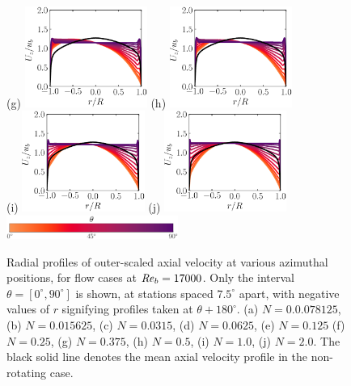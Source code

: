 \documentclass[lineno]{jfm}
\begin{document}
\begin{figure}
                (g) \includegraphics[width=4cm]{Figures/prof_uzub_rotz0_roty0.1875.eps}
                (h) \includegraphics[width=4cm]{Figures/prof_uzub_rotz0_roty0.25.eps} \\
                (i) \includegraphics[width=4cm]{Figures/prof_uzub_rotz0_roty0.5.eps}
		(j) \includegraphics[width=4cm]{Figures/prof_uzub_rotz0_roty1.0.eps} \\ 
    		\includegraphics[width=0.5\textwidth]{Figures/theta_cmap_half.eps}
     		\caption{
    		Radial profiles of 
    		outer-scaled axial velocity 
    		at various azimuthal positions, 
		for flow cases at $\mbox{\textit{Re}}_b=17000$.
		Only the interval $\theta = [0^{\circ},90^{\circ}]$ is shown, at stations
		spaced $7.5^\circ$ apart, with negative values of $r$ signifying profiles
		taken at $\theta + 180^{\circ}$.
                (a) $N = 0.0.078125$,
                (b) $N = 0.015625$,
                (c) $N = 0.0315$,
                (d) $N = 0.0625$,
                (e) $N = 0.125$
                (f) $N = 0.25$,
                (g) $N = 0.375$,
                (h) $N = 0.5$,
                (i) $N = 1.0$,
                (j) $N = 2.0$.
		The black solid line denotes the mean axial velocity profile in the
    		non-rotating case.
    	}
	\label{fig:uprof}
	\end{figure}
\end{document}
